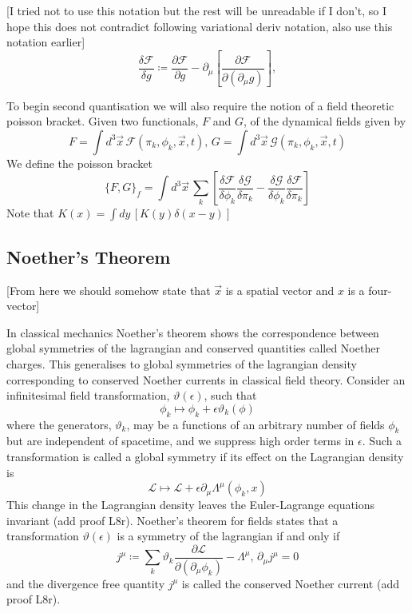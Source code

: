 \documentclass[11pt, a4paper]{article}
\theoremstyle{definition}
\theoremstyle{plain}
\begin{document}
[I tried not to use this notation but the rest will be unreadable if I don't, so I hope this
does not contradict following variational deriv notation, also use this notation earlier]
\begin{equation}
  \frac{\delta \mathcal{F}}{\delta g} \coloneq \frac{\partial \mathcal{F}}{\partial g}
  - \partial_\mu \left[ \frac{\partial \mathcal{F}}{\partial (\partial_\mu g)} \right],
\end{equation}

To begin second quantisation we will also require the notion of a field theoretic poisson bracket.
Given two functionals, $F$ and $G$, of the dynamical fields given by 
\begin{equation}
  F = \int{d^3\vec{x}\, \mathcal{F}(\pi_k, \phi_k, \vec{x}, t)},\,
  G = \int{d^3\vec{x}\, \mathcal{G}(\pi_k, \phi_k, \vec{x}, t)}
\end{equation}
We define the poisson bracket
\begin{equation}
  {\{F, G \}}_{f} = \int{d^3\vec{x}\,
  \sum_{k}{\left[ \frac{\delta \mathcal{F}}{\delta \phi_k}\frac{\delta \mathcal{G}}{\delta \pi_k} 
- \frac{\delta \mathcal{G}}{\delta \phi_k}\frac{\delta \mathcal{F}}{\delta \pi_k} \right]}  }
\end{equation}
Note that $K({x}) = \int{d{y}\,[K({y}) \delta(x - y)]}$


\subsection{Noether's Theorem}
[From here we should somehow state that $\vec{x}$ is a spatial vector and $x$ is a four-vector]

In classical mechanics Noether's theorem shows the correspondence between global symmetries of 
the lagrangian and conserved quantities called Noether charges. This generalises to global symmetries
of the lagrangian density corresponding to conserved Noether currents in classical field theory.
Consider an infinitesimal field transformation, $\vartheta(\epsilon)$, such that
\begin{equation}
  \phi_k \mapsto \phi_k + \epsilon\vartheta_k(\phi)
\end{equation}
where the generators, $\vartheta_k$, may be a functions of an arbitrary number of fields $\phi_k$ but
are independent of spacetime, and we suppress high order terms in $\epsilon$.
Such a transformation is called a global symmetry if its effect on the Lagrangian density is
\begin{equation}
  \mathcal{L} \mapsto \mathcal{L} + \epsilon\partial_\mu\Lambda^\mu(\phi_k, x)
\end{equation}
This change in the Lagrangian density leaves the Euler-Lagrange equations invariant (add proof L8r).
Noether's theorem for fields states that a transformation $\vartheta(\epsilon)$ is a symmetry
of the lagrangian if and only if 
\begin{equation}
  j^\mu \coloneq
  \sum_{k}{\vartheta_k \frac{\partial \mathcal{L}}{\partial (\partial_\mu \phi_k)}}
  - \Lambda^\mu, \, \partial_\mu j^\mu = 0 
\end{equation}
and the divergence free quantity $j^\mu$ is called the conserved Noether current (add proof L8r).
\end{document}
